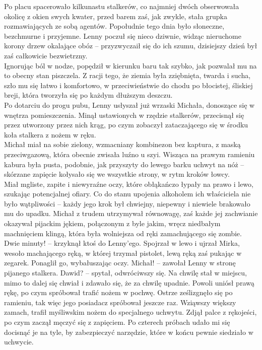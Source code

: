 \documentclass[../MAIN.tex]{subfiles}
\begin{document}
Po placu spacerowało kilkunastu stalkerów, co najmniej dwóch obserwowała okolicę z okien swych kwater, przed barem zaś, jak zwykle, stała grupka rozmawiających ze sobą agentów. Popołudnie tego dnia było słoneczne, bezchmurne i przyjemne. Lenny poczuł się nieco dziwnie, widząc nieruchome korony drzew okalające obóz -- przyzwyczaił się do ich szumu, dzisiejszy dzień był zaś całkowicie bezwietrzny.\\
Ignorując ból w nodze, popędził w kierunku baru tak szybko, jak pozwalał mu na to obecny stan piszczela. Z racji tego, że ziemia była zziębnięta, twarda i sucha, szło mu się łatwo i komfortowo, w przeciwieństwie do chodu po błocistej, śliskiej breji, która tworzyła się po każdym dłuższym deszczu.\\
Po dotarciu do progu pubu, Lenny usłyszał już wrzaski Michała, donoszące się w wnętrza pomieszczenia. Minął ustawionych w rzędzie stalkerów, przecisnął się przez utworzony przez nich krąg, po czym zobaczył zataczającego się w środku koła stalkera z nożem w ręku.\\
Michał miał na sobie zielony, wzmacniany kombinezon bez kaptura, z maską przeciwgazową, która obecnie zwisała luźno u szyi. Wisząca na prawym ramieniu kabura była pusta, podobnie, jak przyszyty do lewego barku uchwyt na nóż -- skórzane zapięcie kołysało się we wszystkie strony, w rytm kroków łowcy.\\
Miał mgliste, zapite i niewyraźne oczy, które obłąkańczo łypały na prawo i lewo, szukając potencjalnej ofiary. Co do stanu upojenia alkoholem ich właściciela nie było wątpliwości -- każdy jego krok był chwiejny, niepewny i niewiele brakowało mu do upadku. Michał z trudem utrzymywał równowagę, zaś każde jej zachwianie okazywał pijackim jękiem, połączonym z byle jakim, wręcz niedbałym machnięciem klingą, która była wolniejsza od ręki zamachującego się zombie.
\sx Dwie minuty! -- krzyknął ktoś do Lenny'ego.
\qd
Spojrzał w lewo i ujrzał Mirka, wesoło machającego ręką, w której trzymał pistolet, lewą ręką zaś pukając w zegarek. Ponaglił go, wybałuszając oczy.
\sx Michał! -- zawołał Lenny w stronę pijanego stalkera.
\xx Dawid? -- spytał, odwróciwszy się. 
\qd
Na chwilę stał w miejscu, mimo to dalej się chwiał i zdawało się, że za chwilę upadnie. Powoli uniósł prawą rękę, po czym spróbował trafić nożem w pochwę. Ostrze ześlizgnęło się po ramieniu, tak więc jego posiadacz spróbował jeszcze raz. Wziąwszy większy zamach, trafił myśliwskim nożem do specjalnego uchwytu. Zdjął palce z rękojeści, po czym zaczął męczyć się z zapięciem. Po czterech próbach udało mi się docisnąć je na tyle, by zabezpieczyć narzędzie, które w końcu pewnie siedziało w uchwycie.
\end{document}
